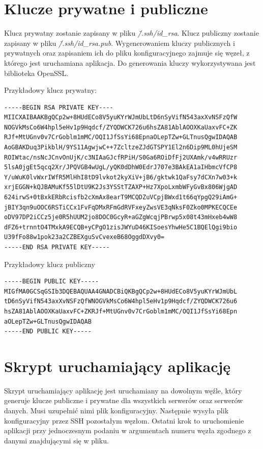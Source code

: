 \section{Klucze prywatne i publiczne}
Klucz prywatny zostanie zapisany w pliku \textit{\~/.ssh/id\_rsa}.
Klucz publiczny zostanie zapisany w pliku \textit{\~/.ssh/id\_rsa.pub}.
Wygenerowaniem kluczy publicznych i prywatnych oraz zapisaniem ich do pliku
konfiguracyjnego zajmuje się węzeł, z którego jest uruchamiana aplikacja. Do generowania kluczy wykorzystywana jest biblioteka OpenSSL.

Przykładowy klucz prywatny:
\begin{lstlisting}[style=incode]
-----BEGIN RSA PRIVATE KEY----
MIICXAIBAAKBgQCp2w+8HUdECo8V5yuKYrWJmUbLtD6nSyVifN543axXvNSFzQfW
NOGVkMsCo6W4hpl5eHv1p9Hqdcf/ZYQDWCK726u6hsZA81AblAOOXKaUaxvFC+ZK
RJf+MtUGnv0v7CrGoblm1mMC/OQI1JfSsYi68EpnaOLepTZw+GLTnusQgwIDAQAB
AoGBAKDuq3PikblH/9YS11AgwjwC++7ZcltzeZJdGTSPY1El2n6Dip9ML0hUjeSM
ROIWtac/nsNcJCnvOnUjK/c3NIAaGJcfRPiH/S0Ga6ROiDfFj2UXAmk/v4wRRUzr
5lsA0jgEt5qcq2Xr/JPQVGB4wUgL/yQK0dDhW0EdrJ707e3BAkEA1aIHbmcVfCP8
Y/uWuK0lvWxrIWfR5MlHhI8tD9lvkot2kyXiV+jB6/gktwk1QaFsy7dCXn7w03+k
xrjEGGN+kQJBAMuKf55lDtU9K2Js3YSStTZAXP+Hz7XpoLxmbWFyGvBx806WjgAD
624irwS+0tBxkERbRcisfb2cXmAx8earT9MCQDZuVCpjBWxd1t66qYpgQ29iAmG+
jBIY3qn9uOOC6RSTiCCx1FvFqDMxRFmGdRVFxeyZwsVE3qNksF0Zko0MPKECQCEe
oDV97DP2iCCz5je0R5hUUM2jo8DOC0GcyR+aGZgWcqjPBrwp5x08t43mHxeb4wW8
dFZ6+trnntO4TMxkA9ECQB+yCPgO1zisJWYuD46KISoesYhwHe5C1BQElQgi9bio
U39fFo88w1pok23a2CZBEXguSvCvexeB68OggdDXvy0=
-----END RSA PRIVATE KEY-----
\end{lstlisting}

Przykładowy klucz publiczny
\begin{lstlisting}[style=incode]
-----BEGIN PUBLIC KEY----- 
MIGfMA0GCSqGSIb3DQEBAQUAA4GNADCBiQKBgQCp2w+8HUdECo8V5yuKYrWJmUbL
tD6nSyVifN543axXvNSFzQfWNOGVkMsCo6W4hpl5eHv1p9Hqdcf/ZYQDWCK726u6
hsZA81AblAOOXKaUaxvFC+ZKRJf+MtUGnv0v7CrGoblm1mMC/OQI1JfSsYi68Epn
aOLepTZw+GLTnusQgwIDAQAB
-----END PUBLIC KEY-----
\end{lstlisting}


\section{Skrypt uruchamiający aplikację}
Skrypt uruchamiający aplikację jest uruchamiany na dowolnym węźle, który generuje klucze publiczne i prywatne dla wszystkich serwerów oraz serwerów danych. Musi uzupełnić nimi plik konfiguracyjny. Następnie wysyła plik konfiguracyjny przez SSH pozostałym węzłom. Ostatni krok to uruchomienie aplikacji przy jednoczesnym podaniu w argumentach numeru węzła zgodnego z danymi znajdującymi się w pliku.